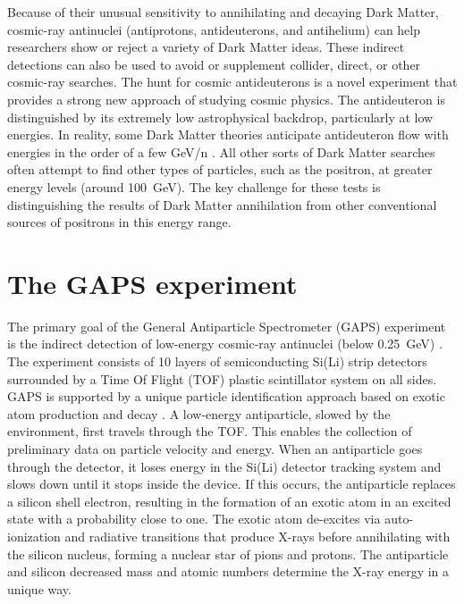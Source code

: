 \noindent
Because of their unusual sensitivity to annihilating and decaying Dark Matter, cosmic-ray antinuclei (antiprotons, antideuterons, and antihelium) can help researchers show or reject a variety of Dark Matter ideas. These indirect detections can also be used to avoid or supplement collider, direct, or other cosmic-ray searches. The hunt for cosmic antideuterons is a novel experiment that provides a strong new approach of studying cosmic physics. The antideuteron is distinguished by its extremely low astrophysical backdrop, particularly at low energies. In reality, some Dark Matter theories anticipate antideuteron flow with energies in the order of a few GeV/n \cite{doetinchem_2020_cosmicray}. All other sorts of Dark Matter searches often attempt to find other types of particles, such as the positron, at greater energy levels (around \SI{100}{\giga\electronvolt}). The key challenge for these tests is distinguishing the results of Dark Matter annihilation from other conventional sources of positrons in this energy range.


\section{The GAPS experiment}
\label{appendixGAPSexperiment}
The primary goal of the General Antiparticle Spectrometer (GAPS) experiment is the indirect detection of low-energy cosmic-ray antinuclei (below \SI{0.25}{\giga\electronvolt}) \cite{doetinchem_2020_cosmicray}. The experiment consists of 10 layers of semiconducting Si(Li) strip detectors surrounded by a Time Of Flight (TOF) plastic scintillator system on all sides. GAPS is supported by a unique particle identification approach based on exotic atom production and decay \cite{re_2022_a}\cite{re_2022_b}. A low-energy antiparticle, slowed by the environment, first travels through the TOF. This enables the collection of preliminary data on particle velocity and energy. When an antiparticle goes through the detector, it loses energy in the Si(Li) detector tracking system and slows down until it stops inside the device. If this occurs, the antiparticle replaces a silicon shell electron, resulting in the formation of an exotic atom in an excited state with a probability close to one. The exotic atom de-excites via auto-ionization and radiative transitions that produce X-rays before annihilating with the silicon nucleus, forming a nuclear star of pions and protons. The antiparticle and silicon decreased mass and atomic numbers determine the X-ray energy in a unique way.

